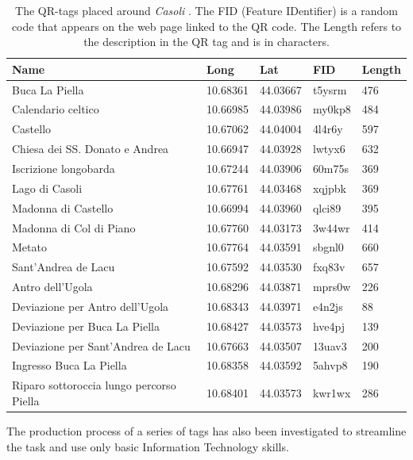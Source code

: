 \documentclass[sustainability,article,submit,pdftex,moreauthors]{Definitions/mdpi}
\begin{document}
\begin{table}
    \begin{tabular} {|>{\raggedright\arraybackslash}p{3cm}|l|l|l|l|}
        \hline 
        \textbf{Name} & \textbf{Long} & \textbf{Lat} & \textbf{FID} & \textbf{Length} \\ \hline
        Buca La Piella & 10.68361 & 44.03667 & t5ysrm & 476 \\ \hline
        Calendario celtico & 10.66985 & 44.03986 & my0kp8 & 484 \\ \hline
        Castello & 10.67062 & 44.04004 & 4l4r6y & 597 \\ \hline
        Chiesa dei SS. Donato e Andrea & 10.66947 & 44.03928 & lwtyx6 & 632 \\ \hline
        Iscrizione longobarda & 10.67244 & 44.03906 & 60m75s & 369 \\ \hline
        Lago di Casoli & 10.67761 & 44.03468 & xqjpbk & 369 \\ \hline
        Madonna di Castello & 10.66994 & 44.03960 & qlci89 & 395 \\ \hline
        Madonna di Col di Piano & 10.67760 & 44.03173 & 3w44wr & 414 \\ \hline
        Metato & 10.67764 & 44.03591 & sbgnl0 & 660 \\ \hline
        Sant'Andrea de Lacu & 10.67592 & 44.03530 & fxq83v & 657 \\ \hline
        Antro dell’Ugola & 10.68296 & 44.03871 & mprs0w & 226 \\ \hline
        Deviazione per Antro dell’Ugola & 10.68343 & 44.03971 & e4n2js & 88 \\ \hline
        Deviazione per Buca La Piella & 10.68427 & 44.03573 & hve4pj & 139 \\ \hline
        Deviazione per Sant’Andrea de Lacu & 10.67663 & 44.03507 & 13uav3 & 200 \\ \hline
        Ingresso Buca La Piella & 10.68358 & 44.03592 & 5ahvp8 & 190 \\ \hline
        Riparo sottoroccia lungo percorso Piella & 10.68401 & 44.03573 & kwr1wx & 286 \\    \hline
    \end{tabular}
\caption{The QR-tags placed around \emph{Casoli} . The FID (Feature IDentifier) is a random code that appears on the web page linked to the QR code. The Length refers to the description in the QR tag and is in characters. \label{tab:qrtags}}
\end{table}

The production process of a series of tags has also been investigated to streamline the task and use only basic Information Technology skills.
\end{document}
